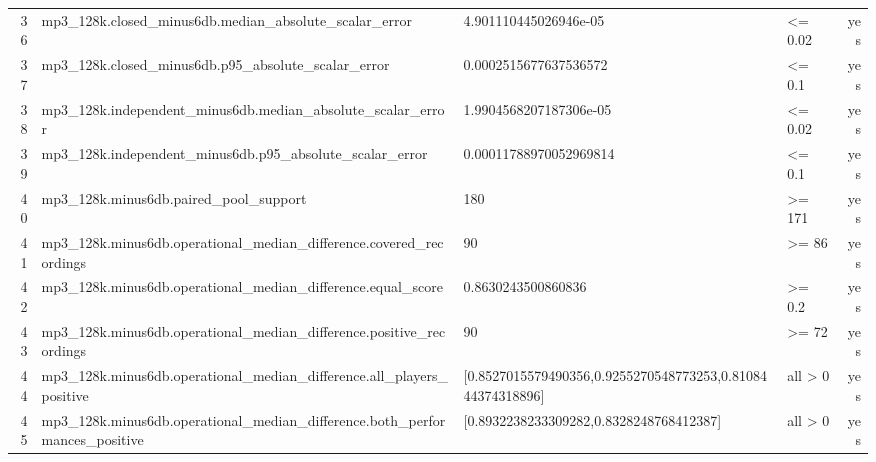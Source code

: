 \documentclass{article}
\begin{document}
\begin{longtable}{r p{5cm} p{4cm} p{2.5cm} r}
36 & mp3\_\allowbreak{}128k.\allowbreak{}closed\_\allowbreak{}minus6db.\allowbreak{}median\_\allowbreak{}absolute\_\allowbreak{}scalar\_\allowbreak{}error & 4.\allowbreak{}901110445026946e-05 & <= 0.\allowbreak{}02 & yes \\
37 & mp3\_\allowbreak{}128k.\allowbreak{}closed\_\allowbreak{}minus6db.\allowbreak{}p95\_\allowbreak{}absolute\_\allowbreak{}scalar\_\allowbreak{}error & 0.\allowbreak{}0002515677637536572 & <= 0.\allowbreak{}1 & yes \\
38 & mp3\_\allowbreak{}128k.\allowbreak{}independent\_\allowbreak{}minus6db.\allowbreak{}median\_\allowbreak{}absolute\_\allowbreak{}scalar\_\allowbreak{}error & 1.\allowbreak{}9904568207187306e-05 & <= 0.\allowbreak{}02 & yes \\
39 & mp3\_\allowbreak{}128k.\allowbreak{}independent\_\allowbreak{}minus6db.\allowbreak{}p95\_\allowbreak{}absolute\_\allowbreak{}scalar\_\allowbreak{}error & 0.\allowbreak{}00011788970052969814 & <= 0.\allowbreak{}1 & yes \\
40 & mp3\_\allowbreak{}128k.\allowbreak{}minus6db.\allowbreak{}paired\_\allowbreak{}pool\_\allowbreak{}support & 180 & >= 171 & yes \\
41 & mp3\_\allowbreak{}128k.\allowbreak{}minus6db.\allowbreak{}operational\_\allowbreak{}median\_\allowbreak{}difference.\allowbreak{}covered\_\allowbreak{}recordings & 90 & >= 86 & yes \\
42 & mp3\_\allowbreak{}128k.\allowbreak{}minus6db.\allowbreak{}operational\_\allowbreak{}median\_\allowbreak{}difference.\allowbreak{}equal\_\allowbreak{}score & 0.\allowbreak{}8630243500860836 & >= 0.\allowbreak{}2 & yes \\
43 & mp3\_\allowbreak{}128k.\allowbreak{}minus6db.\allowbreak{}operational\_\allowbreak{}median\_\allowbreak{}difference.\allowbreak{}positive\_\allowbreak{}recordings & 90 & >= 72 & yes \\
44 & mp3\_\allowbreak{}128k.\allowbreak{}minus6db.\allowbreak{}operational\_\allowbreak{}median\_\allowbreak{}difference.\allowbreak{}all\_\allowbreak{}players\_\allowbreak{}positive & [0.\allowbreak{}8527015579490356,\allowbreak{}0.\allowbreak{}9255270548773253,\allowbreak{}0.\allowbreak{}8108444374318896] & all > 0 & yes \\
45 & mp3\_\allowbreak{}128k.\allowbreak{}minus6db.\allowbreak{}operational\_\allowbreak{}median\_\allowbreak{}difference.\allowbreak{}both\_\allowbreak{}performances\_\allowbreak{}positive & [0.\allowbreak{}8932238233309282,\allowbreak{}0.\allowbreak{}8328248768412387] & all > 0 & yes \\

\end{longtable}
\end{document}
